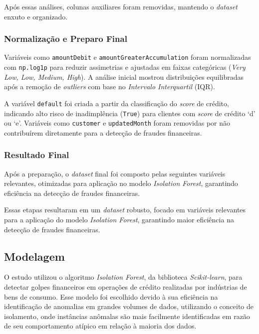 \documentclass[12pt,a4paper]{article}
\begin{document}
Após essas análises, colunas auxiliares foram removidas, mantendo o \textit{dataset} enxuto e organizado.

\subsubsection{Normalização e Preparo Final}

Variáveis como \texttt{amountDebit} e \texttt{amountGreaterAccumulation} foram normalizadas com \texttt{np.log1p} para reduzir assimetrias e ajustadas em faixas categóricas (\textit{Very Low, Low, Medium, High}). A análise inicial mostrou distribuições equilibradas após a remoção de \textit{outliers} com base no \textit{Intervalo Interquartil} (IQR).

A variável \texttt{default} foi criada a partir da classificação do \textit{score} de crédito, indicando alto risco de inadimplência (\texttt{True}) para clientes com \textit{score} de crédito `d' ou `e'. Variáveis como \texttt{customer} e \texttt{updatedMonth} foram removidas por não contribuírem diretamente para a detecção de fraudes financeiras.

\subsubsection{Resultado Final}

Após a preparação, o \textit{dataset} final foi composto pelas seguintes variáveis relevantes, otimizadas para aplicação no modelo \textit{Isolation Forest}, garantindo eficiência na detecção de fraudes financeiras.


Essas etapas resultaram em um \textit{dataset} robusto, focado em variáveis relevantes para a aplicação do modelo \textit{Isolation Forest}, garantindo maior eficiência na detecção de fraudes financeiras.


\subsection{Modelagem}

O estudo utilizou o algoritmo \textit{Isolation Forest}, da biblioteca \textit{Scikit-learn}, para detectar golpes financeiros em operações de crédito realizadas por indústrias de bens de consumo. Esse modelo foi escolhido devido à sua eficiência na identificação de anomalias em grandes volumes de dados, utilizando o conceito de isolamento, onde instâncias anômalas são mais facilmente identificadas em razão de seu comportamento atípico em relação à maioria dos dados.
\end{document}
